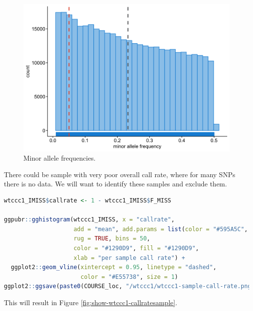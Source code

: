 \documentclass[
]{book}
\begin{document}
\begin{figure}

{\centering \includegraphics[width=18.67in]{img/_gwas_wtccc/WTCCC1-FREQ} 

}

\caption{Minor allele frequencies.}\label{fig:show-wtccc1-freq}
\end{figure}

There could be sample with very poor overall call rate, where for many SNPs there is no data. We will want to identify these samples and exclude them.

\begin{lstlisting}[language=R]
wtccc1_IMISS$callrate <- 1 - wtccc1_IMISS$F_MISS

ggpubr::gghistogram(wtccc1_IMISS, x = "callrate",
                    add = "mean", add.params = list(color = "#595A5C", linetype = "dashed", size = 1),
                    rug = TRUE, bins = 50,
                    color = "#1290D9", fill = "#1290D9",
                    xlab = "per sample call rate") +
  ggplot2::geom_vline(xintercept = 0.95, linetype = "dashed",
                      color = "#E55738", size = 1)
ggplot2::ggsave(paste0(COURSE_loc, "/wtccc1/wtccc1-sample-call-rate.png"), plot = last_plot())
\end{lstlisting}

This will result in Figure \ref{fig:show-wtccc1-callratesample}.
\end{document}
